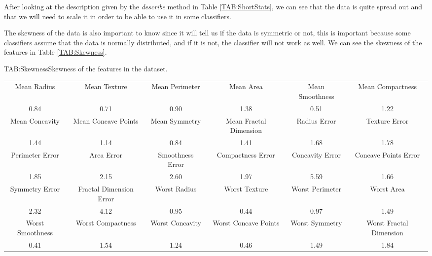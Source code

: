 After looking at the description given by the \textit{describe} method in Table \ref{TAB:ShortStats}, we can see that the data is quite spread out and that we will need to scale it in order to be able to use it in some classifiers.

The skewness of the data is also important to know since it will tell us if the data is symmetric or not, this is important because some classifiers assume that the data is normally distributed, and if it is not, the classifier will not work as well. We can see the skewness of the features in Table \ref{TAB:Skewness}.

\begin{table}[Skewness]{TAB:Skewness}{Skewness of the features in the dataset.}
    \begin{adjustbox}{width=1\linewidth}

        \small
        \begin{tabular}{|c|c|c|c|c|c|}

            \hline
            Mean Radius      & Mean Texture            & Mean Perimeter   & Mean Area              & Mean Smoothness & Mean Compactness        \\

            0.84             & 0.71                    & 0.90             & 1.38                   & 0.51            & 1.22                    \\
            \hline
            Mean Concavity   & Mean Concave Points     & Mean Symmetry    & Mean Fractal Dimension & Radius Error    & Texture Error           \\
            1.44             & 1.14                    & 0.84             & 1.41                   & 1.68            & 1.78                    \\
            \hline
            Perimeter Error  & Area Error              & Smoothness Error & Compactness Error      & Concavity Error & Concave Points Error    \\
            1.85             & 2.15                    & 2.60             & 1.97                   & 5.59            & 1.66                    \\
            \hline
            Symmetry Error   & Fractal Dimension Error & Worst Radius     & Worst Texture          & Worst Perimeter & Worst Area              \\
            2.32             & 4.12                    & 0.95             & 0.44                   & 0.97            & 1.49                    \\
            \hline
            Worst Smoothness & Worst Compactness       & Worst Concavity  & Worst Concave Points   & Worst Symmetry  & Worst Fractal Dimension \\
            0.41             & 1.54                    & 1.24             & 0.46                   & 1.49            & 1.84                    \\
            \hline
            \hline


\end{tabular}
\end{adjustbox}
\end{table}
